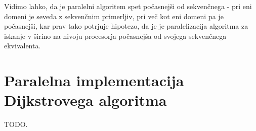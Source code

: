 \documentclass[mat1, tisk]{fmfdelo}
\begin{document}
Vidimo lahko, da je paralelni algoritem spet počasnejši od sekvenčnega - pri eni domeni je seveda z sekvenčnim primerljiv,
pri več kot eni domeni pa je počasnejši, kar prav tako potrjuje hipotezo, da je je paralelizacija algoritma za iskanje
v širino na nivoju procesorja počasnejša od svojega sekvenčnega ekvivalenta.


\section{Paralelna implementacija Dijkstrovega algoritma}

TODO.
\end{document}
